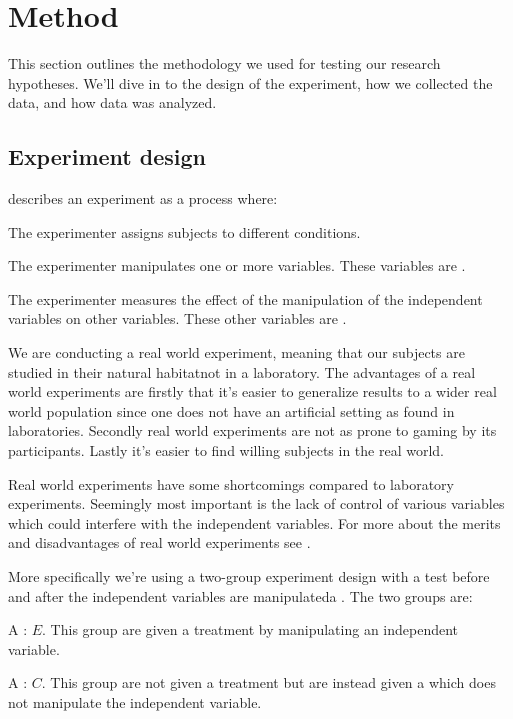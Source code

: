 \section{Method}
\label{section:empirical.methodology}

This section outlines the methodology we used for testing our research
hypotheses. We'll dive in to the design of the experiment, how we collected
the data, and how data was analyzed.

\subsection{Experiment design}
\label{section:empirical.methodology.experiment.design}

\citet[]{robson93} describes an experiment as a process where:


\begin{items}
  \item The experimenter assigns subjects to different conditions.
  \item The experimenter manipulates one or more variables.
    These variables are .
  \item The experimenter measures the effect of the manipulation of
    the independent variables on other variables. These other
    variables are .
\end{items}

We are conducting a real world experiment, meaning that our subjects
are studied in their natural habitat\dash{}not in a laboratory.
The advantages of a real world experiments are firstly that it's easier to
generalize results to a wider real world population since one does not have
an artificial setting as found in laboratories. Secondly real world
experiments are not as prone to gaming by its participants. Lastly it's easier
to find willing subjects in the real world.

Real world experiments have some shortcomings compared to laboratory
experiments. Seemingly most important is the lack of control of various
variables which could interfere with the independent variables.
For more about the merits and disadvantages of real world experiments
see \citet[]{robson93}.

More specifically we're using a two-group experiment design with a test before
and after the independent variables are manipulated\dash{}a .
The two groups are:

\begin{items}
  \item A : $E$. This group are given a treatment by
    manipulating an independent variable.
  \item A : $C$. This group are not given a treatment but
    are instead given a  which does not manipulate the
    independent variable.
\end{items}


